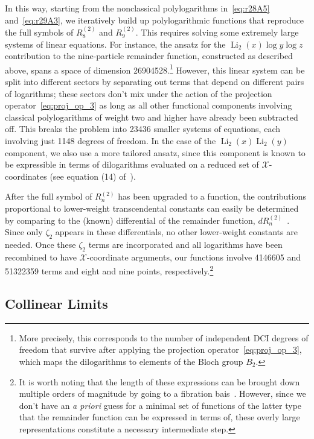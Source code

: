 \documentclass[11pt]{article}
\DeclareMathOperator{\Li}{Li}
\def\x{\mathcal{X}}
\begin{document}
In this way, starting from the nonclassical polylogarithms in~\eqref{eq:r28A5} and~\eqref{eq:r29A3}, we iteratively build up polylogarithmic functions that reproduce the full symbols of $R_8^{(2)}$\! and $R_9^{(2)}$\!. This requires solving some extremely large systems of linear equations. For instance, the ansatz for the $\Li_2(x) \log y  \log z$ contribution to the nine-particle remainder function, constructed as described above, spans a space of dimension 26904528.\footnote{More precisely, this corresponds to the number of independent DCI degrees of freedom that survive after applying the projection operator~\eqref{eq:proj_op_3}, which maps the dilogarithms to elements of the Bloch group $B_2$.} However, this linear system can be split into different sectors by separating out terms that depend on different pairs of logarithms; these sectors don't mix under the action of the projection operator~\eqref{eq:proj_op_3} as long as all other functional components involving classical polylogarithms of weight two and higher have already been subtracted off. This breaks the problem into 23436 smaller systems of equations, each involving just 1148 degrees of freedom. In the case of the $\Li_2(x) \Li_2(y)$ component, we also use a more tailored ansatz, since this component is known to be expressible in terms of dilogarithms evaluated on a reduced set of $\x$-coordinates (see equation (14) of~\cite{Golden:2014pua}).

After the full symbol of $R_n^{(2)}$\! has been upgraded to a function, the contributions proportional to lower-weight transcendental constants can easily be determined by comparing to the (known) differential of the remainder function, $dR_n^{(2)}$\!~\cite{CaronHuot:2011ky,Golden:2013lha}. Since only $\zeta_2$ appears in these differentials, no other lower-weight constants are needed. Once these $\zeta_2$ terms are incorporated and all logarithms have been recombined to have $\x$-coordinate arguments, our functions involve 4146605 and 51322359 terms and eight and nine points, respectively.\footnote{It is worth noting that the length of these expressions can be brought down multiple orders of magnitude by going to a fibration bais~\cite{Brown:2009qja}. However, since we don't have an \emph{a priori} guess for a minimal set of functions of the latter type that the remainder function can be expressed in terms of, these overly large representations constitute a necessary intermediate step.}

\subsection{Collinear Limits}
\label{sec:collinear_limits}
\end{document}
